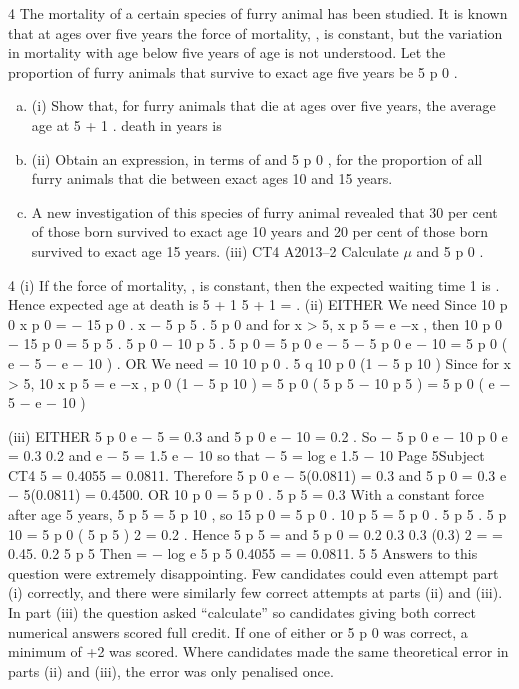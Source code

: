 \documentclass[a4paper,12pt]{article}
\begin{document}
4
The mortality of a certain species of furry animal has been studied. It is known that at ages over five years the force of mortality, \mu, is constant, but the variation in mortality with age below five years of age is not understood. Let the proportion of furry
animals that survive to exact age five years be 5 p 0 .
\begin{enumerate}[(a)]
\item (i) Show that, for furry animals that die at ages over five years, the average age at
5 \mu + 1
.
death in years is

\mu
\item (ii) Obtain an expression, in terms of \mu and 5 p 0 , for the proportion of all furry
animals that die between exact ages 10 and 15 years.

\item A new investigation of this species of furry animal revealed that 30 per cent of those
born survived to exact age 10 years and 20 per cent of those born survived to exact
age 15 years.
(iii)
CT4 A2013–2
Calculate $\mu$ and
5
p 0 .

\end{enumerate}


4
(i)
If the force of mortality, \mu, is constant, then the expected waiting time
1
is .
\mu
Hence expected age at death is 5 +
1 5 \mu + 1
=
.
\mu
\mu
(ii)
EITHER
We need
Since
10 p 0
x p 0
=
− 15 p 0 .
x − 5 p 5 . 5 p 0
and for x > 5,
x
p 5 = e −\mu x ,
then
10
p 0 − 15 p 0 = 5 p 5 . 5 p 0 − 10 p 5 . 5 p 0 = 5 p 0 e − 5 \mu − 5 p 0 e − 10 \mu = 5 p 0 ( e − 5 \mu − e − 10 \mu ) .
OR
We need
=
10
10
p 0 . 5 q 10
p 0 (1 − 5 p 10 )
Since for x > 5,
10
x
p 5 = e −\mu x ,
p 0 (1 − 5 p 10 ) = 5 p 0 ( 5 p 5 − 10 p 5 ) = 5 p 0 ( e − 5 \mu − e − 10 \mu )

(iii)
EITHER
5
p 0 e − 5 \mu = 0.3 and 5 p 0 e − 10 \mu = 0.2 .
So
− 5  p 0 e
− 10  p 0 e
=
0.3
0.2
and e − 5 \mu = 1.5 e − 10 \mu
so that − 5 \mu = log e 1.5 − 10 \mu
Page 5Subject CT4 %
5 \mu = 0.4055
\mu = 0.0811.
Therefore 5 p 0 e − 5(0.0811) = 0.3
and
5 p 0
=
0.3
e
− 5(0.0811)
= 0.4500.
OR
10
p 0 = 5 p 0 . 5 p 5 = 0.3
With a constant force after age 5 years, 5 p 5 = 5 p 10 ,
so 15 p 0 = 5 p 0 . 10 p 5 = 5 p 0 . 5 p 5 . 5 p 10 = 5 p 0 ( 5 p 5 ) 2 = 0.2 .
Hence 5 p 5 =
and 5 p 0 =
0.2
0.3
0.3 (0.3) 2
=
= 0.45.
0.2
5 p 5
Then \mu = −
log e 5 p 5 0.4055
=
= 0.0811.
5
5
Answers to this question were extremely disappointing. Few candidates could even attempt
part (i) correctly, and there were similarly few correct attempts at parts (ii) and (iii). In part
(iii) the question asked “calculate” so candidates giving both correct numerical answers
scored full credit. If one of either \mu or 5 p 0 was correct, a minimum of +2 was scored. Where
candidates made the same theoretical error in parts (ii) and (iii), the error was only
penalised once.
\end{document}
